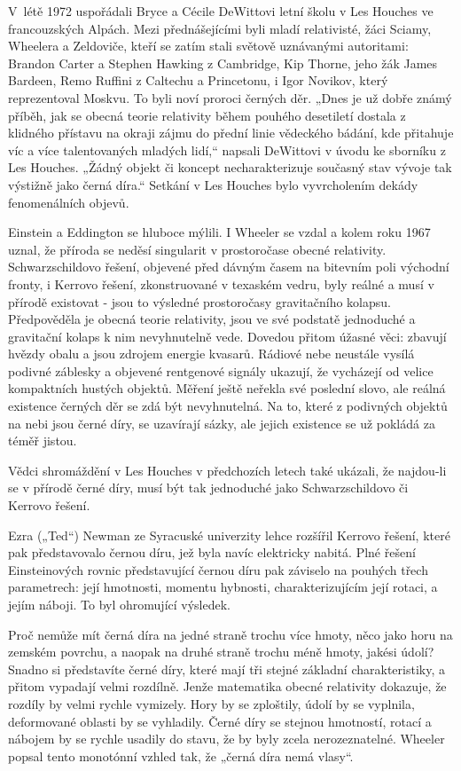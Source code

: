   V létě 1972 uspořádali Bryce a Cécile DeWittovi letní školu v Les Houches ve francouzských Alpách.
  Mezi přednášejícími byli mladí relativisté, žáci Sciamy, Wheelera a Zeldoviče, kteří se zatím
  stali světově uznávanými autoritami: Brandon Carter a Stephen Hawking z Cambridge, Kip Thorne,
  jeho žák James Bardeen, Remo Ruffini z Caltechu a Princetonu, i Igor Novikov, který reprezentoval
  Moskvu. To byli noví proroci černých děr. „Dnes je už dobře známý příběh, jak se obecná teorie
  relativity během pouhého desetiletí dostala z klidného přístavu na okraji zájmu do přední linie
  vědeckého bádání, kde přitahuje víc a více talentovaných mladých lidí,“ napsali DeWittovi v úvodu
  ke sborníku z Les Houches. „Žádný objekt či koncept necharakterizuje současný stav vývoje tak
  výstižně jako černá díra.“ Setkání v Les Houches bylo vyvrcholením dekády fenomenálních objevů. 

  Einstein a Eddington se hluboce mýlili. I Wheeler se vzdal a kolem roku 1967 uznal, že příroda se
  neděsí singularit v prostoročase obecné relativity. Schwarzschildovo řešení, objevené před dávným
  časem na bitevním poli východní fronty, i Kerrovo řešení, zkonstruované v texaském vedru, byly
  reálné a musí v přírodě existovat - jsou to výsledné prostoročasy gravitačního kolapsu.
  Předpověděla je obecná teorie relativity, jsou ve své podstatě jednoduché a gravitační kolaps k
  nim nevyhnutelně vede. Dovedou přitom úžasné věci: zbavují hvězdy obalu a jsou zdrojem energie
  kvasarů. Rádiové nebe neustále vysílá podivné záblesky a objevené rentgenové signály ukazují, že
  vycházejí od velice kompaktních hustých objektů. Měření ještě neřekla své poslední slovo, ale
  reálná existence černých děr se zdá být nevyhnutelná. Na to, které z podivných objektů na nebi
  jsou černé díry, se uzavírají sázky, ale jejich existence se už pokládá za téměř jistou. 

  Vědci shromáždění v Les Houches v předchozích letech také ukázali, že najdou-li se v přírodě černé
  díry, musí být tak jednoduché jako Schwarzschildovo či Kerrovo řešení. 

  Ezra („Ted“) Newman ze Syracuské univerzity lehce rozšířil Kerrovo řešení, které pak představovalo
  černou díru, jež byla navíc elektricky nabitá. Plné řešení Einsteinových rovnic představující
  černou díru pak záviselo na pouhých třech parametrech: její hmotnosti, momentu hybnosti,
  charakterizujícím její rotaci, a jejím náboji. To byl ohromující výsledek. 

  Proč nemůže mít černá díra na jedné straně trochu více hmoty, něco jako horu na zemském povrchu, a
  naopak na druhé straně trochu méně hmoty, jakési údolí? Snadno si představíte černé díry, které
  mají tři stejné základní charakteristiky, a přitom vypadají velmi rozdílně. Jenže matematika
  obecné relativity dokazuje, že rozdíly by velmi rychle vymizely. Hory by se zploštily, údolí by se
  vyplnila, deformované oblasti by se vyhladily. Černé díry se stejnou hmotností, rotací a nábojem
  by se rychle usadily do stavu, že by byly zcela nerozeznatelné. Wheeler popsal tento monotónní
  vzhled tak, že „černá díra nemá vlasy“. 

